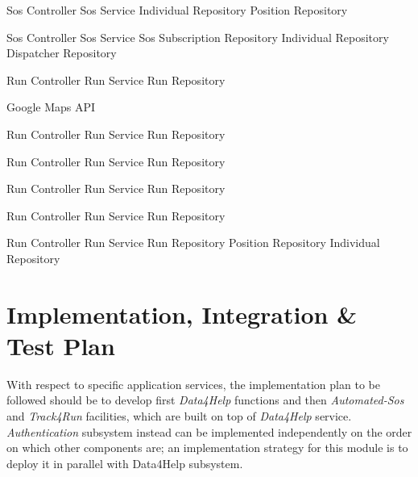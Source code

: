 \documentclass[a4paper]{article}
\begin{document}
\begin{description}
     {Sos Controller}
     {Sos Service}
     {Individual Repository}
     {Position Repository}
     
     {Sos Controller}
     {Sos Service}
     {Sos Subscription Repository}
     {Individual Repository}
     {Dispatcher Repository}
     
     {Run Controller}
     {Run Service}
     {Run Repository}
     
     {Google Maps API}
     
     {Run Controller}
     {Run Service}
     {Run Repository}
     
     {Run Controller}
     {Run Service}
     {Run Repository}
     
     {Run Controller}
     {Run Service}
     {Run Repository}
     
     {Run Controller}
     {Run Service}
     {Run Repository}
     
     {Run Controller}
     {Run Service}
     {Run Repository}
     {Position Repository}
     {Individual Repository}
     
\end{description}

\newpage
\section{Implementation, Integration \& Test Plan}
With respect to specific application services, the implementation plan to be followed should be to develop first \textit{Data4Help} functions and then \textit{Automated-Sos} and \textit{Track4Run} facilities, which are built on top of \textit{Data4Help} service.\\

\textit{Authentication} subsystem instead can be implemented independently on the order on which other components are; an implementation strategy for this module is to deploy it in parallel with Data4Help subsystem.
\end{document}

